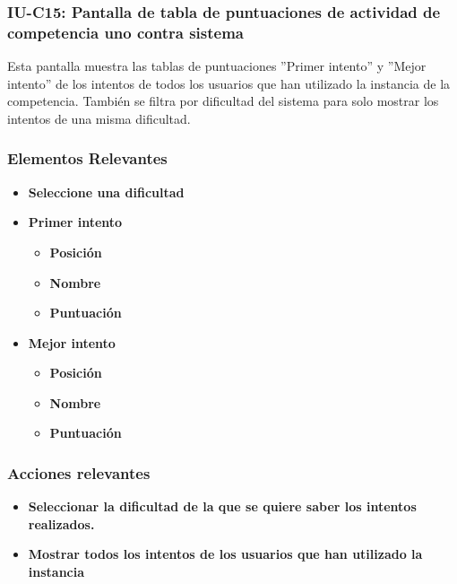
\subsubsection{IU-C15: Pantalla de tabla de puntuaciones de actividad de competencia uno contra sistema}

 Esta pantalla muestra las tablas de puntuaciones ''Primer intento'' y ''Mejor intento'' de los intentos de todos los usuarios que han utilizado la instancia de la competencia. También se filtra por dificultad del sistema para solo mostrar los intentos de una misma dificultad.


\subsubsection{Elementos Relevantes}

    \begin{itemize}
    \item {\bf Seleccione una dificultad}
    \item {\bf Primer intento}
    \begin{itemize}
      \item {\bf Posición}
      \item {\bf Nombre}
      \item {\bf Puntuación}
    \end{itemize}
    \item {\bf Mejor intento}
    \begin{itemize}
      \item {\bf Posición}
      \item {\bf Nombre}
      \item {\bf Puntuación}
    \end{itemize}
    \end{itemize}

\subsubsection{Acciones relevantes}

    \begin{itemize}
    \item {\bf Seleccionar la dificultad de la que se quiere saber los intentos realizados.}
    \item {\bf Mostrar todos los intentos de los usuarios que han utilizado la instancia}
    \end{itemize}

\clearpage
